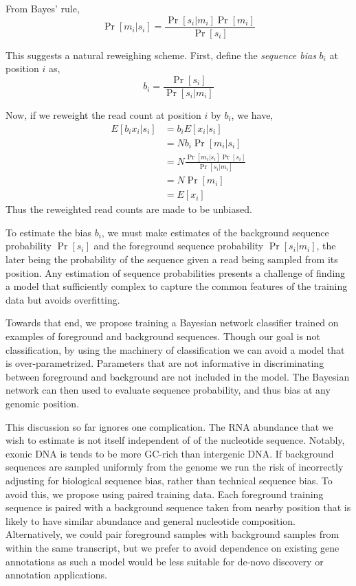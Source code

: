 \documentclass{bioinfo}
\begin{document}
From Bayes' rule,
$$ \Pr[ m_i | s_i ] = \frac{ \Pr[ s_i | m_i ] \Pr[ m_i ] }{ \Pr[ s_i ] } $$

This suggests a natural reweighing scheme. First, define the \emph{sequence
bias} $b_i$ at position $i$ as,
$$ b_i = \frac{ \Pr[ s_i ] } { \Pr[ s_i | m_i ] } $$

Now, if we reweight the read count at position $i$ by $b_i$, we
have,
\begin{align*}
E[ b_i x_i  | s_i ] &= b_i E[ x_i | s_i ] \\
&= N b_i \Pr[ m_i | s_i ] \\
&= N \frac{ \Pr[ m_i | s_i ] \Pr[ s_i ] }{ \Pr[ s_i | m_i ] } \\
&= N \Pr[ m_i ] \\
&= E[ x_i ]
\end{align*}
Thus the reweighted read counts are made to be unbiased.


To estimate the bias $b_i$, we must make estimates of the background sequence
probability $\Pr[s_i]$ and the foreground sequence probability $\Pr[ s_i | m_i
]$, the later being the probability of the sequence given a read being sampled
from its position. Any estimation of sequence probabilities presents a challenge
of finding a model that sufficiently complex to capture the common features of
the training data but avoids overfitting.

Towards that end, we propose training a Bayesian network classifier trained on
examples of foreground and background sequences. Though our goal is not
classification, by using the machinery of classification we can avoid a model
that is over-parametrized. Parameters that are not informative in
discriminating between foreground and background are not included in the model.
The Bayesian network can then used to evaluate sequence probability, and thus
bias at any genomic position.

This discussion so far ignores one complication. The RNA abundance that we wish to
estimate is not itself independent of of the nucleotide sequence. Notably,
exonic DNA is tends to be more GC-rich than intergenic DNA. If background
sequences are sampled uniformly from the genome we run the risk of incorrectly
adjusting for biological sequence bias, rather than technical sequence bias. To
avoid this, we propose using paired training data. Each foreground training
sequence is paired with a background sequence taken from nearby position that is
likely to have similar abundance and general nucleotide composition.
Alternatively, we could pair foreground samples with background samples from
within the same transcript, but we prefer to avoid dependence on existing gene
annotations as such a model would be less suitable for de-novo discovery or
annotation applications.
\end{document}
